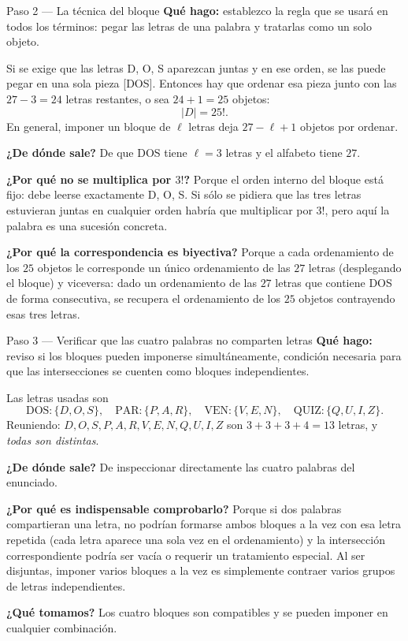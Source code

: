 \documentclass[11pt]{article}
\begin{document}
\begin{paso}{Paso 2 --- La técnica del bloque}
\textbf{Qué hago:} establezco la regla que se usará en todos los términos: pegar las letras de una palabra y tratarlas como un solo objeto.

Si se exige que las letras D, O, S aparezcan juntas y en ese orden, se las puede pegar en una sola pieza [DOS]. Entonces hay que ordenar esa pieza junto con las $27-3 = 24$ letras restantes, o sea $24+1 = 25$ objetos:
\[
|D| = 25! .
\]
En general, imponer un bloque de $\ell$ letras deja $27-\ell+1$ objetos por ordenar.

\textbf{¿De dónde sale?} De que DOS tiene $\ell=3$ letras y el alfabeto tiene $27$.

\textbf{¿Por qué no se multiplica por $3!$?} Porque el orden interno del bloque está fijo: debe leerse exactamente D, O, S. Si sólo se pidiera que las tres letras estuvieran juntas en cualquier orden habría que multiplicar por $3!$, pero aquí la palabra es una sucesión concreta.

\textbf{¿Por qué la correspondencia es biyectiva?} Porque a cada ordenamiento de los $25$ objetos le corresponde un único ordenamiento de las $27$ letras (desplegando el bloque) y viceversa: dado un ordenamiento de las $27$ letras que contiene DOS de forma consecutiva, se recupera el ordenamiento de los $25$ objetos contrayendo esas tres letras.
\end{paso}

\begin{paso}{Paso 3 --- Verificar que las cuatro palabras no comparten letras}
\textbf{Qué hago:} reviso si los bloques pueden imponerse simultáneamente, condición necesaria para que las intersecciones se cuenten como bloques independientes.

Las letras usadas son
\[
\text{DOS}: \{D,O,S\},\quad \text{PAR}: \{P,A,R\},\quad \text{VEN}: \{V,E,N\},\quad \text{QUIZ}: \{Q,U,I,Z\} .
\]
Reuniendo: $D,O,S,P,A,R,V,E,N,Q,U,I,Z$ son $3+3+3+4 = 13$ letras, y \emph{todas son distintas}.

\textbf{¿De dónde sale?} De inspeccionar directamente las cuatro palabras del enunciado.

\textbf{¿Por qué es indispensable comprobarlo?} Porque si dos palabras compartieran una letra, no podrían formarse ambos bloques a la vez con esa letra repetida (cada letra aparece una sola vez en el ordenamiento) y la intersección correspondiente podría ser vacía o requerir un tratamiento especial. Al ser disjuntas, imponer varios bloques a la vez es simplemente contraer varios grupos de letras independientes.

\textbf{¿Qué tomamos?} Los cuatro bloques son compatibles y se pueden imponer en cualquier combinación.
\end{paso}
\end{document}

